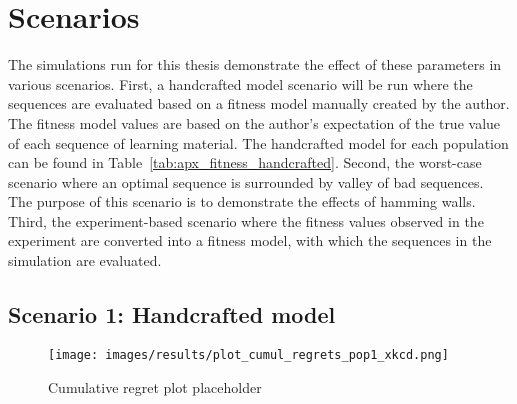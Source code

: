 \section{Scenarios}
The simulations run for this thesis demonstrate the effect of these parameters
in various scenarios. First, a handcrafted model scenario will be run where the
sequences are evaluated based on a fitness model manually created by the
author. The fitness model values are based on the author's expectation of the
true value of each sequence of learning material. The handcrafted model for
each population can be found in
Table~\ref{tab:apx_fitness_handcrafted}. Second, the worst-case scenario where
an optimal sequence is surrounded by valley of bad sequences. The purpose of
this scenario is to demonstrate the effects of hamming walls. Third, the
experiment-based scenario where the fitness values observed in the experiment
are converted into a fitness model, with which the sequences in the simulation
are evaluated.
\subsection{Scenario 1: Handcrafted model}
\begin{figure}[ht]
	\centering
	\texttt{[image: images/results/plot\_cumul\_regrets\_pop1\_xkcd.png]}
	\caption{Cumulative regret plot placeholder}
	\label{fig:cumul_placeholder1}
\end{figure}
